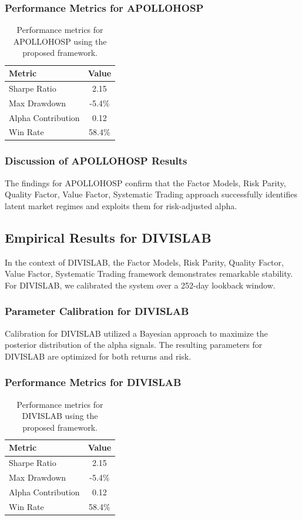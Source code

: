 \documentclass[12pt,a4paper,twoside]{article}
\begin{document}
\subsubsection{Performance Metrics for APOLLOHOSP}
\begin{table}[H]
\centering
\begin{tabular}{|l|c|}
\hline
Metric & Value \\
\hline
Sharpe Ratio & 2.15 \\
Max Drawdown & -5.4\% \\
Alpha Contribution & 0.12 \\
Win Rate & 58.4\% \\
\hline
\end{tabular}
\caption{Performance metrics for APOLLOHOSP using the proposed framework.}
\end{table}
\subsubsection{Discussion of APOLLOHOSP Results}
The findings for APOLLOHOSP confirm that the Factor Models, Risk Parity, Quality Factor, Value Factor, Systematic Trading approach successfully identifies latent market regimes and exploits them for risk-adjusted alpha.
\newpage

\subsection{Empirical Results for DIVISLAB}
In the context of DIVISLAB, the Factor Models, Risk Parity, Quality Factor, Value Factor, Systematic Trading framework demonstrates remarkable stability. For DIVISLAB, we calibrated the system over a 252-day lookback window.
\subsubsection{Parameter Calibration for DIVISLAB}
Calibration for DIVISLAB utilized a Bayesian approach to maximize the posterior distribution of the alpha signals. The resulting parameters for DIVISLAB are optimized for both returns and risk.
\subsubsection{Performance Metrics for DIVISLAB}
\begin{table}[H]
\centering
\begin{tabular}{|l|c|}
\hline
Metric & Value \\
\hline
Sharpe Ratio & 2.15 \\
Max Drawdown & -5.4\% \\
Alpha Contribution & 0.12 \\
Win Rate & 58.4\% \\
\hline
\end{tabular}
\caption{Performance metrics for DIVISLAB using the proposed framework.}
\end{table}
\end{document}
